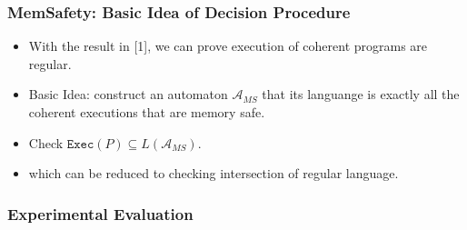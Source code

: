 \documentclass[aspectratio=1610, 13pt]{beamer}
\begin{document}
\begin{frame}\frametitle{MemSafety: Basic Idea of Decision Procedure}

\begin{itemize}
\item 
With the result in [1], we can prove execution of coherent programs are regular.
\item 
Basic Idea: construct an automaton $\mathcal{A}_{MS}$ that its languange is exactly all the coherent executions that are memory safe.

\item Check $\mathtt{Exec}(P)\subseteq L(\mathcal{A}_{MS})$.

\item which can be reduced to checking intersection of regular language.
\end{itemize}



\end{frame}

\begin{frame}\frametitle{Experimental Evaluation}

\end{frame}
\end{document}
